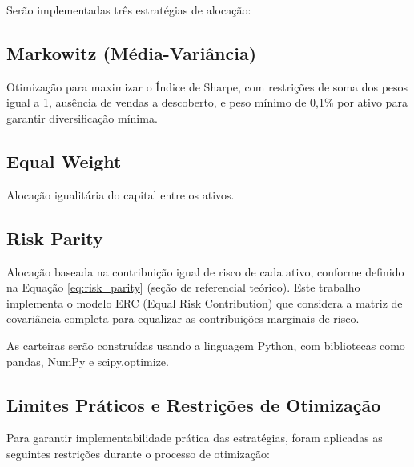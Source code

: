 Serão implementadas três estratégias de alocação:

\subsection{Markowitz (Média-Variância)}
Otimização para maximizar o Índice de Sharpe, com restrições de soma dos pesos igual a 1, ausência de vendas a descoberto, e peso mínimo de 0,1\% por ativo para garantir diversificação mínima.

\subsection{Equal Weight}
Alocação igualitária do capital entre os ativos.

\subsection{Risk Parity}
Alocação baseada na contribuição igual de risco de cada ativo, conforme definido na Equação \ref{eq:risk_parity} (seção de referencial teórico). Este trabalho implementa o modelo ERC (Equal Risk Contribution) que considera a matriz de covariância completa para equalizar as contribuições marginais de risco.

As carteiras serão construídas usando a linguagem Python, com bibliotecas como pandas, NumPy e scipy.optimize.

\subsection{Limites Práticos e Restrições de Otimização}

Para garantir implementabilidade prática das estratégias, foram aplicadas as seguintes restrições durante o processo de otimização:


